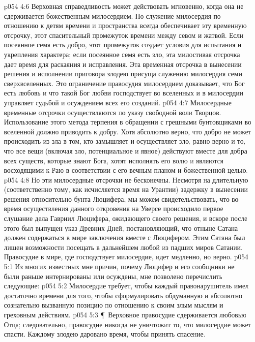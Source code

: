 \vs p054 4:6 Верховная справедливость может действовать мгновенно, когда она не сдерживается божественным милосердием. Но служение милосердия по отношению к детям времени и пространства всегда обеспечивает эту временную отсрочку, этот спасительный промежуток времени между севом и жатвой. Если посеянное семя есть добро, этот промежуток создает условия для испытания и укрепления характера; если посеянное семя есть зло, эта милостивая отсрочка дает время для раскаяния и исправления. Эта временная отсрочка в вынесении решения и исполнении приговора злодею присуща служению милосердия семи сверхвселенных. Это ограничение правосудия милосердием доказывает, что Бог есть любовь и что такой Бог любви господствует во вселенных и в милосердии управляет судьбой и осуждением всех его созданий.
\vs p054 4:7 Милосердные временные отсрочки осуществляются по указу свободной воли Творцов. Использование этого метода терпения в обращении с грешными бунтовщиками во вселенной должно приводить к добру. Хотя абсолютно верно, что добро не может происходить из зла в том, кто замышляет и осуществляет зло, равно верно и то, что все вещи (включая зло, потенциальное и явное) действуют вместе для добра всех существ, которые знают Бога, хотят исполнять его волю и являются восходящими к Раю в соответствии с его вечным планом и божественной целью.
\vs p054 4:8 Но эти милосердные отсрочки не бесконечны. Несмотря на длительную (соответственно тому, как исчисляется время на Урантии) задержку в вынесении решения относительно бунта Люцифера, мы можем свидетельствовать, что во время осуществления данного откровения на Уверсе происходило первое слушание дела Гавриил  Люцифера, ожидающего своего решения, и вскоре после этого был выпущен указ Древних Дней, постановляющий, что отныне Сатана должен содержаться в мире заключения вместе с Люцифером. Этим Сатана был лишен возможности посещать в дальнейшем любой из падших миров Сатании. Правосудие в мире, где господствует милосердие, идет медленно, но верно.
\vs p054 5:1 Из многих известных мне причин, почему Люцифер и его сообщники не были раньше интернированы или осуждены, мне позволено перечислить следующие:
\vs p054 5:2 \bibnobreakspace Милосердие требует, чтобы каждый правонарушитель имел достаточно времени для того, чтобы сформулировать обдуманную и абсолютно сознательно вызванную позицию по отношению к своим злым мыслям и греховным действиям.
\vs p054 5:3 \P\ \bibnobreakspace Верховное правосудие сдерживается любовью Отца; следовательно, правосудие никогда не уничтожит то, что милосердие может спасти. Каждому злодею даровано время, чтобы принять спасение.
